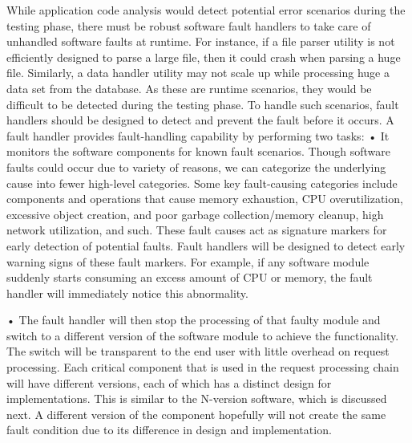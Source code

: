While application code analysis would detect potential error scenarios during the testing phase, there must be robust software fault handlers to take care of unhandled software faults at runtime. For instance, if a file parser utility is not efficiently designed to parse a large file, then it could crash when parsing a huge file. Similarly, a data handler utility may not scale up while processing huge a data set from the database. As these are runtime scenarios, they would be difficult to be detected during the testing phase. To handle such scenarios, fault handlers should be designed to detect and prevent the fault before it occurs. A fault handler provides fault-handling capability by performing two tasks:
• It monitors the software components for known fault scenarios. Though software faults could occur due to variety of reasons, we can categorize the underlying cause into fewer high-level categories. Some key fault-causing categories include components and operations that cause memory exhaustion, CPU overutilization, excessive object creation, and poor garbage collection/memory cleanup, high network utilization, and such. These fault causes act as signature markers for early detection of potential faults. Fault handlers will be designed to detect early warning signs of these fault markers. For example, if any software module suddenly starts consuming an excess amount of CPU or memory, the fault handler will immediately notice this abnormality.

• The fault handler will then stop the processing of that faulty module and switch to a different version of the software module to achieve the functionality. The switch will be transparent to the end user with little overhead on request processing. Each critical component that is used in the request processing chain will have different versions, each of which has a distinct design for implementations. This is similar to the N-version software, which is discussed next. A different version of the component hopefully will not create the same fault condition due to its difference in design and implementation.


